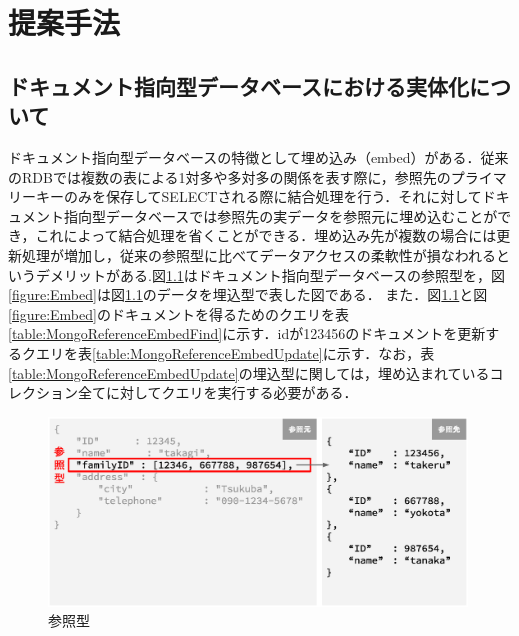 \documentclass[a4paper,11pt]{ujreport}
\begin{document}
\chapter{提案手法}
\label{chap:ProposedAlgorithm}
\section{ドキュメント指向型データベースにおける実体化について}
ドキュメント指向型データベースの特徴として埋め込み（embed）がある．従来のRDBでは複数の表による1対多や多対多の関係を表す際に，参照先のプライマリーキーのみを保存してSELECTされる際に結合処理を行う．それに対してドキュメント指向型データベースでは参照先の実データを参照元に埋め込むことができ，これによって結合処理を省くことができる．埋め込み先が複数の場合には更新処理が増加し，従来の参照型に比べてデータアクセスの柔軟性が損なわれるというデメリットがある\cite{Sky株式会社201212}.図\ref{figure:Reference}はドキュメント指向型データベースの参照型を，図\ref{figure:Embed}は図\ref{figure:Reference}のデータを埋込型で表した図である．
また．図\ref{figure:Reference}と図\ref{figure:Embed}のドキュメントを得るためのクエリを表\ref{table:MongoReferenceEmbedFind}に示す．idが123456のドキュメントを更新するクエリを表\ref{table:MongoReferenceEmbedUpdate}に示す．なお，表\ref{table:MongoReferenceEmbedUpdate}の埋込型に関しては，埋め込まれているコレクション全てに対してクエリを実行する必要がある．
\begin{figure}[htbp]
	\begin{center}
		\includegraphics[width=30em, trim=0 5em 0 2em]{src/Reference.eps} %
	\end{center}
	\caption{参照型}
	\label{figure:Reference}
\end{figure}
\end{document}
